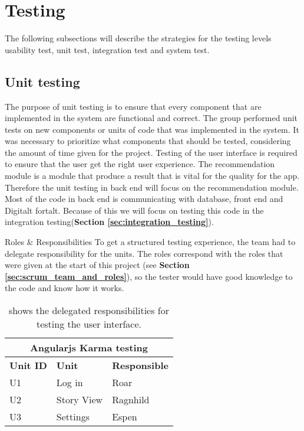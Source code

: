 
\chapter{Testing}
\label{chap:testing}

The following subsections will describe the strategies for the testing levels usability test, unit test, integration test and system test. 

\section{Unit testing}
\label{sec:unit_testing}

The purpose of unit testing is to ensure that every component that are implemented in the system are functional and correct. The group performed unit tests on new components or units of code that was implemented in the system. It was necessary to prioritize what components that should be tested, considering the amount of time given for the project. Testing of the user interface is required to ensure that the user get the right user experience. The recommendation module is a module that produce a result that is vital for the quality for the app. Therefore the unit testing in back end will focus on the recommendation module. Most of the code in back end is communicating with database, front end and Digitalt fortalt. Because of this we will focus on testing this code in the integration testing(\textbf{Section \ref{sec:integration_testing}}).\newline

Roles \& Responsibilities\newline
To get a structured testing experience, the team had to delegate responsibility for the units. The roles correspond with the roles that were given at the start of this project (see \textbf{Section \ref{sec:scrum_team_and_roles}}), so the tester would have good knowledge to the code and know how it works.  

\begin{table}[!h]
	\begin{center}
		\begin{tabular}{ | l | l | l |}
			\hline
			\multicolumn{3}{|c|}{\textbf{Angularjs Karma testing}} \\
			\hline
			\textbf{Unit ID} & \textbf{Unit} & \textbf{Responsible} \\ \hline
			U1 & Log in & Roar \\ \hline
			U2 & Story View & Ragnhild \\ \hline
			U3 & Settings & Espen \\ \hline
		\end{tabular}
	\end{center}
	\caption{shows the delegated responsibilities for testing the user interface.}
	\label{Tab:karmatesting}
\end{table}

